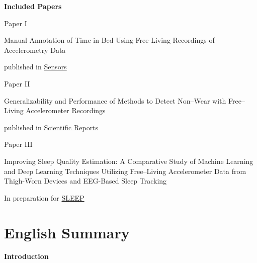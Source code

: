 \documentclass[
  10pt,
]{scrbook}
\newcommand{\aftertocpagenum}{
   \cleardoublepage
   \pagenumbering{arabic}
 }
\renewcommand*\contentsname{Table of contents}
\newcommand\contentsname{Table of contents}
\begin{document}
\newpage

\textsf{\textbf{\Large{Included Papers}}}

\vspace{2cm}

\begin{center}

Paper I

\textsf{Manual Annotation of Time in Bed Using Free-Living Recordings of Accelerometry Data}

published in \href{https://doi.org/10.3390/s21248442}{Sensors}

\vspace{2cm}
Paper II

\textsf{Generalizability and Performance of Methods to Detect Non–Wear with Free–Living Accelerometer Recordings}

published in \href{https://doi.org/10.1038/s41598-023-29666-x}{Scientific Reports}

\vspace{2cm}
Paper III 

\textsf{Improving Sleep Quality Estimation: A Comparative Study of Machine Learning and Deep Learning Techniques Utilizing Free–Living Accelerometer Data from Thigh-Worn Devices and EEG-Based Sleep Tracking}

In preparation for \href{https://academic.oup.com/sleep}{SLEEP}

\end{center}\renewcommand*\contentsname{Table of contents}
{
\hypersetup{linkcolor=}
\setcounter{tocdepth}{2}
\tableofcontents
}
\listoffigures
\listoftables
\mainmatter
\aftertocpagenum

\hypertarget{english-summary}{%
\chapter{English Summary}\label{english-summary}}

\textbf{Introduction}
\end{document}
